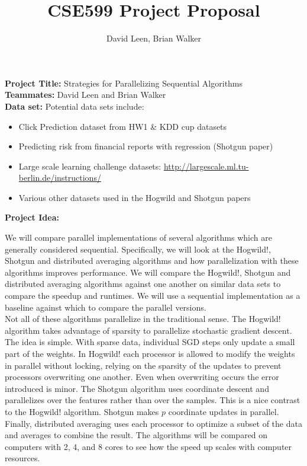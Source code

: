 \documentclass{article}
\title{CSE599 Project Proposal}
\author{David Leen, Brian Walker}
\begin{document}
\maketitle

\textbf{Project Title:}  Strategies for Parallelizing Sequential Algorithms \\
\textbf{Teammates:}  David Leen and Brian Walker \\
\textbf{Data set:} Potential data sets include: 
	\begin{itemize}
		\item Click Prediction dataset from HW1 \& KDD cup datasets
		\item Predicting risk from financial reports with regression (Shotgun paper)
		\item Large scale learning challenge datasets: \url{http://largescale.ml.tu-berlin.de/instructions/}
		\item Various other datasets used in the Hogwild and Shotgun papers 
	\end{itemize}
	
\textbf{Project Idea:}

	We will compare parallel implementations of several algorithms which are generally considered sequential. 
Specifically, we will look at the Hogwild!, Shotgun and distributed averaging algorithms and how parallelization with these 
algorithms improves performance. We will compare the Hogwild!, Shotgun and distributed averaging algorithms against 
one another on similar data sets to compare the speedup and runtimes.  We will use a sequential implementation as a 
baseline against which to compare the parallel versions.  \\
	
	Not all of these algorithms parallelize in the traditional sense. The Hogwild! algorithm takes advantage of sparsity to 
parallelize stochastic gradient descent. The idea is simple. With sparse data, individual SGD steps only update a small part 
of the weights. In Hogwild! each processor is allowed to modify the weights in parallel without locking, relying on the 
sparsity of the updates to prevent processors overwriting one another. Even when overwriting occurs the error introduced is 
minor.
	The Shotgun algorithm uses coordinate descent and parallelizes over the features rather than over the samples. This 
is a nice contrast to the Hogwild! algorithm. Shotgun makes $p$ coordinate updates in parallel.
	Finally, distributed averaging uses each processor to optimize a subset of the data and averages to combine the 
result. 
	The algorithms will be compared on computers with 2, 4, and 8 cores to see how the speed up scales with computer 
resources.
		
\end{document}
